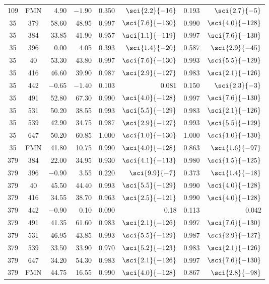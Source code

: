 \begin{longtable}{ccrrrrrr}
109 & FMN & 4.90 & $-1.90$ & 0.350 & $\sci{2.2}{-16}$ & 0.193 & $\sci{2.7}{-5}$ \\
35  & 379 & 58.60 & 48.95 & 0.997 & $\sci{7.6}{-130}$ & 0.990 & $\sci{4.0}{-128}$ \\
35  & 384 & 33.85 & 41.90 & 0.957 & $\sci{1.1}{-119}$ & 0.997 & $\sci{7.6}{-130}$ \\
35  & 396 & 0.00 & 4.05 & 0.393 & $\sci{1.4}{-20}$ & 0.587 & $\sci{2.9}{-45}$ \\
35  & 40  & 53.30 & 43.80 & 0.997 & $\sci{7.6}{-130}$ & 0.993 & $\sci{5.5}{-129}$ \\
35  & 416 & 46.60 & 39.90 & 0.987 & $\sci{2.9}{-127}$ & 0.983 & $\sci{2.1}{-126}$ \\
35  & 442 & $-0.65$ & $-1.40$ & 0.103 & 0.081 & 0.150 & $\sci{2.3}{-3}$ \\
35  & 491 & 52.80 & 67.30 & 0.990 & $\sci{4.0}{-128}$ & 0.997 & $\sci{7.6}{-130}$ \\
35  & 531 & 50.20 & 38.55 & 0.993 & $\sci{5.5}{-129}$ & 0.983 & $\sci{2.1}{-126}$ \\
35  & 539 & 42.90 & 34.75 & 0.987 & $\sci{2.9}{-127}$ & 0.993 & $\sci{5.5}{-129}$ \\
35  & 647 & 50.20 & 60.85 & 1.000 & $\sci{1.0}{-130}$ & 1.000 & $\sci{1.0}{-130}$ \\
35  & FMN & 41.80 & 10.75 & 0.990 & $\sci{4.0}{-128}$ & 0.863 & $\sci{1.6}{-97}$ \\
379 & 384 & 22.00 & 34.95 & 0.930 & $\sci{4.1}{-113}$ & 0.980 & $\sci{1.5}{-125}$ \\
379 & 396 & $-0.90$ & 3.55 & 0.220 & $\sci{9.9}{-7}$ & 0.373 & $\sci{1.4}{-18}$ \\
379 & 40  & 45.50 & 44.40 & 0.993 & $\sci{5.5}{-129}$ & 0.990 & $\sci{4.0}{-128}$ \\
379 & 416 & 34.55 & 38.70 & 0.963 & $\sci{2.5}{-121}$ & 0.990 & $\sci{4.0}{-128}$ \\
379 & 442 & $-0.90$ & 0.10 & 0.090 & 0.18 & 0.113 & 0.042 \\
379 & 491 & 41.35 & 61.60 & 0.983 & $\sci{2.1}{-126}$ & 0.997 & $\sci{7.6}{-130}$ \\
379 & 531 & 46.95 & 43.85 & 0.993 & $\sci{5.5}{-129}$ & 0.987 & $\sci{2.9}{-127}$ \\
379 & 539 & 33.50 & 33.90 & 0.970 & $\sci{5.2}{-123}$ & 0.983 & $\sci{2.1}{-126}$ \\
379 & 647 & 34.20 & 54.30 & 0.983 & $\sci{2.1}{-126}$ & 0.997 & $\sci{7.6}{-130}$ \\
379 & FMN & 44.75 & 16.55 & 0.990 & $\sci{4.0}{-128}$ & 0.867 & $\sci{2.8}{-98}$ \\

\end{longtable}
